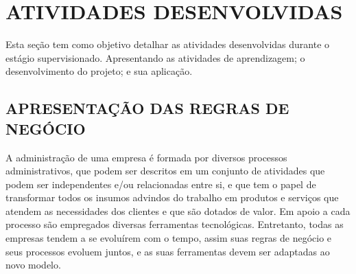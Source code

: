 \documentclass[
  12pt,				%
  openany,
  oneside,
  a4paper,			%
  english,			%
  brazil
]{article}
\numberwithin{figure}{section}
\numberwithin{table}{section}
\begin{document}

\clearpage



\section{ATIVIDADES DESENVOLVIDAS}


Esta seção tem como objetivo detalhar as atividades desenvolvidas durante o estágio supervisionado. Apresentando as atividades de aprendizagem; o desenvolvimento do projeto; e sua aplicação.


\subsection{APRESENTAÇÃO DAS REGRAS DE NEGÓCIO}

A administração de uma empresa é formada por diversos processos administrativos, que podem ser descritos em um conjunto de atividades que podem ser independentes e/ou relacionadas entre si, e que tem o papel de transformar todos os insumos advindos do trabalho em produtos e serviços que atendem as necessidades dos clientes e que são dotados de valor. Em apoio a cada processo são empregados diversas ferramentas tecnológicas. Entretanto, todas as empresas tendem a se evoluírem com o tempo, assim suas regras de negócio e seus processos evoluem juntos, e as suas ferramentas devem ser adaptadas ao novo modelo. 
\end{document}

